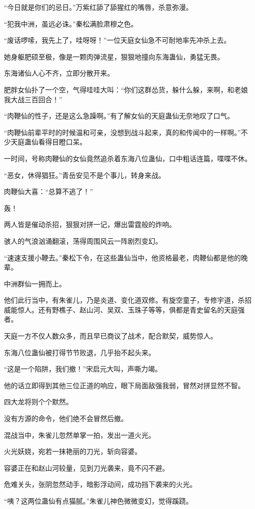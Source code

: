 \begin{this_body}
“今日就是你们的忌日。”万紫红舔了舔猩红的嘴唇，杀意弥漫。

“犯我中洲，虽远必诛。”秦松满脸肃穆之色。

“废话啰嗦，我先上了，哇呀呀！”一位天庭女仙急不可耐地率先冲杀上去。

她身躯肥硕至极，像是一颗肉弹流星，狠狠地撞向东海蛊仙，勇猛无畏。

东海诸仙人心不齐，立即分散开来。

肥胖女仙扑了一个空，气得哇哇大叫：“你们这群怂货，躲什么躲，来啊，和老娘我大战三百回合！”

“肉鞭仙的性子，还是这么急躁啊。”有了解女仙的天庭蛊仙无奈地叹了口气。

“肉鞭仙前辈平时的时候温和可亲，没想到战斗起来，真的和传闻中的一样啊。”不少天庭蛊仙看得目瞪口呆。

一时间，号称肉鞭仙的女仙竟然追杀着东海八位蛊仙，口中粗话连篇，喋喋不休。

“恶女，休得猖狂。”青岳安见不是个事儿，转身来战。

肉鞭仙大喜：“总算不逃了！”

轰！

两人皆是催动杀招，狠狠对拼一记，爆出雷霆般的炸响。

骇人的气浪汹涌翻滚，荡得周围风云一阵剧烈变幻。

“速速支援小鞭去。”秦松下令，在这些蛊仙当中，他资格最老，肉鞭仙都是他的晚辈。

中洲群仙一拥而上。

他们此行当中，有朱雀儿，乃是炎道、变化道双修。有旋空童子，专修宇道，杀招威能惊人。还有野樵子、赵山河、吴双、玉珠子等等，俱都是青史留名的天庭强者。

天庭一方不仅人数众多，而且早已商议了战术，配合默契，威势惊人。

东海八位蛊仙被打得节节败退，几乎抬不起头来。

“这是一个陷阱，我们撤！”宋启元大叫，声嘶力竭。

他的话立即得到其他三位正道的响应，眼下局面敌强我弱，冒然对拼显然不智。

四大龙将则个个默然。

没有方源的命令，他们绝不会冒然后撤。

混战当中，朱雀儿忽然单掌一拍，发出一道火光。

火光妖娆，宛若一抹艳丽的刀光，斩向容婆。

容婆正在和赵山河较量，见到刀光袭来，竟不闪不避。

危难关头，张阴忽然动手，暗影浮动间，成功挡下袭来的火光。

“咦？这两位蛊仙有点猫腻。”朱雀儿神色微微变幻，觉得蹊跷。


\end{this_body}
